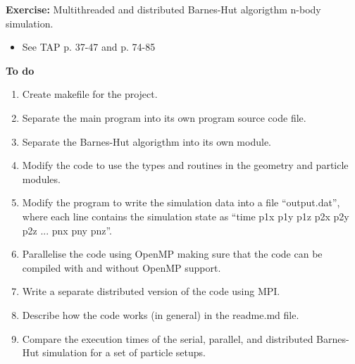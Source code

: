 
\subtitle{Course exercise 2\\ multithreaded and distributed Barnes-Hut simulation}



\begin{frame}
  \titlepage
\end{frame}


\begin{frame}
  \textbf{Exercise:} Multithreaded and distributed Barnes-Hut algorigthm n-body simulation.
  \begin{itemize}
   \item See TAP p. 37-47 and p. 74-85
  \end{itemize}


  \textbf{To do}
  \begin{enumerate}
   \item Create makefile for the project.
   \item Separate the main program into its own program source code file.
   \item Separate the Barnes-Hut algorigthm into its own module.
   \item Modify the code to use the types and routines in the geometry and particle modules.
   \item Modify the program to write the simulation data into a file “output.dat”, where each line contains the simulation state as ``time p1x p1y p1z p2x p2y p2z ... pnx pny pnz''.
   \item Parallelise the code using OpenMP making sure that the code can be compiled with and without OpenMP support.
   \item Write a separate distributed version of the code using MPI.
   \item Describe how the code works (in general) in the readme.md file.
   \item Compare the execution times of the serial, parallel, and distributed Barnes-Hut simulation for a set of particle setups.
  \end{enumerate}
\end{frame}


